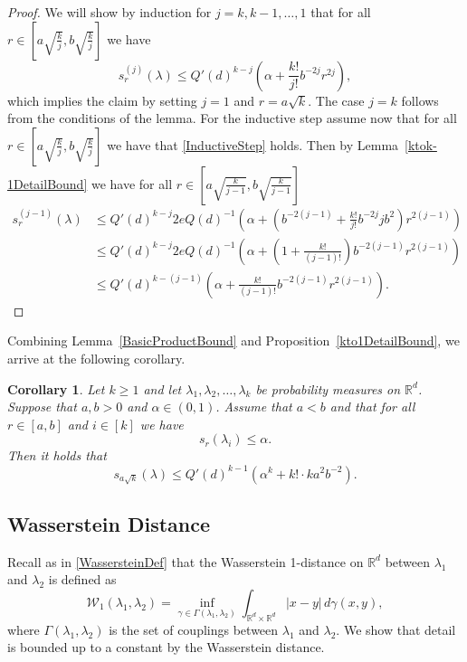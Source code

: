 \documentclass[10pt, english,oneside,reqno]{amsart}
\theoremstyle{plain}
\newtheorem{corollary}[theorem]{Corollary}
\theoremstyle{remark}
\numberwithin{equation}{section}
\numberwithin{figure}{section}
\newcommand{\R}{\mathbb{R}}
\begin{document}
\begin{proof}
    We will show by induction for $j = k,k-1, \ldots , 1$ that for all $r\in \left[ a\sqrt{\frac{k}{j}},  b\sqrt{\frac{k}{j}} \right]$ we have 
    \begin{equation}\label{InductiveStep}
        s_r^{(j)}(\lambda) \leq Q'(d)^{k-j}\left(\alpha + \frac{k!}{j!}b^{-2j}r^{2j}\right),
    \end{equation} which implies the claim by setting $j = 1$ and $r = a\sqrt{k}$.
    The case $j = k$ follows from the conditions of the lemma. For the inductive step assume now that for all $r\in \left[ a\sqrt{\frac{k}{j}},  b\sqrt{\frac{k}{j}} \right]$ we have that \eqref{InductiveStep} holds. Then by Lemma~\ref{ktok-1DetailBound} we have for all $r\in \left[ a\sqrt{\frac{k}{j-1}},  b\sqrt{\frac{k}{j-1}} \right]$ 
    \begin{align*}
        s_r^{(j-1)}(\lambda) &\leq  Q'(d)^{k-j}2eQ(d)^{-1}\left(\alpha + \left(b^{-2(j-1)} + \frac{k!}{j!}b^{-2j}jb^2\right)r^{2(j-1)}\right) \\
        &\leq Q'(d)^{k-j}2eQ(d)^{-1}\left(\alpha + \left(1 + \frac{k!}{(j-1)!}\right)b^{-2(j-1)}r^{2(j-1)}\right) \\
        &\leq Q'(d)^{k-(j-1)}\left(\alpha + \frac{k!}{(j-1)!}b^{-2(j-1)}r^{2(j-1)}\right).
    \end{align*}
\end{proof}

Combining Lemma~\ref{BasicProductBound} and Proposition~\ref{kto1DetailBound}, we arrive at the following corollary.

\begin{corollary}\label{StrongProduct}
    Let $k \geq 1$ and let $\lambda_1, \lambda_2, \ldots , \lambda_k$ be probability measures on $\R^d$. Suppose that $a, b > 0$ and $\alpha \in (0,1)$. Assume that $a < b$ and that for all $r \in [a,b]$ and $i \in [k]$ we have $$s_r(\lambda_i) \leq \alpha.$$ Then it holds that $$s_{a\sqrt{k}}(\lambda) \leq Q'(d)^{k-1}(\alpha^k + k! \cdot k a^2b^{-2}).$$ 
\end{corollary}

\subsection{Wasserstein Distance} \label{Detail:Wasserstein}

Recall as in \eqref{WassersteinDef} that the Wasserstein 1-distance on $\R^d$ between $\lambda_1$ and $\lambda_2$ is defined as $$\mathcal{W}_1(\lambda_1, \lambda_2) = \inf_{\gamma \in \Gamma(\lambda_1, \lambda_2)}  \int_{\R^d \times \R^d} |x-y| \, d\gamma(x,y),$$ where $\Gamma(\lambda_1, \lambda_2)$ is the set of couplings between $\lambda_1$ and $\lambda_2$. We show that detail is bounded up to a constant by the Wasserstein distance.
\end{document}
